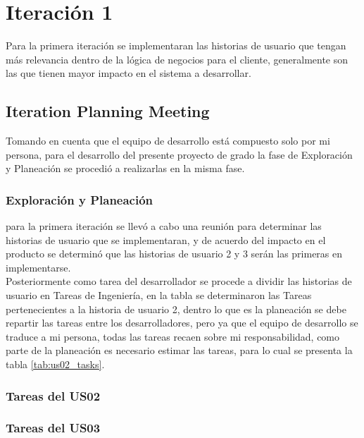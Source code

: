 \chapter{Iteración 1}
\label{chap:iteracion_1}

Para la primera iteración se implementaran las historias de usuario que tengan más relevancia dentro de la lógica de negocios para el cliente, generalmente son las que tienen mayor impacto en el sistema a desarrollar.


\section{Iteration Planning Meeting}
\label{sec:Iteration Planning Meeting}


Tomando en cuenta que el equipo de desarrollo está compuesto solo por mi persona, para el desarrollo del presente proyecto de grado la fase de Exploración y Planeación se procedió a realizarlas en la misma fase.

  \subsection{Exploración y Planeación}
  \label{sub:Exploración y Planeación}

para la primera iteración se llevó a cabo una reunión para determinar las historias de usuario que se implementaran, y de acuerdo del impacto en el producto se determinó que las historias de usuario 2 y 3 serán las primeras en implementarse. \\

Posteriormente como tarea del desarrollador se procede a dividir las historias de usuario en Tareas de Ingeniería, en la tabla se determinaron las Tareas pertenecientes a la historia de usuario 2, dentro lo que es la planeación se debe repartir las tareas entre los desarrolladores, pero ya que el equipo de desarrollo se traduce a mi persona, todas las tareas recaen sobre mi responsabilidad, como parte de la planeación es necesario estimar las tareas, para lo cual se presenta la tabla \ref{tab:us02_tasks}. \\


  \subsection{Tareas del US02}
  \label{sub:us02_tasks}

    

  \subsection{Tareas del US03}
  \label{sub:us03_tasks}

